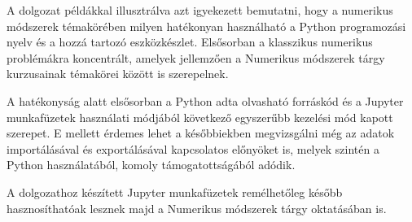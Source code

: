 
A dolgozat példákkal illusztrálva azt igyekezett bemutatni, hogy a numerikus módszerek témakörében milyen hatékonyan használható a Python programozási nyelv és a hozzá tartozó eszközkészlet. Elsősorban a klasszikus numerikus problémákra koncentrált, amelyek jellemzően a Numerikus módszerek tárgy kurzusainak témakörei között is szerepelnek.

A hatékonyság alatt elsősorban a Python adta olvasható forráskód és a Jupyter munkafüzetek használati módjából következő egyszerűbb kezelési mód kapott szerepet. E mellett érdemes lehet a későbbiekben megvizsgálni még az adatok importálásával és exportálásával kapcsolatos előnyöket is, melyek szintén a Python használatából, komoly támogatottságából adódik.

A dolgozathoz készített Jupyter munkafüzetek remélhetőleg később hasznosíthatóak lesznek majd a Numerikus módszerek tárgy oktatásában is.
